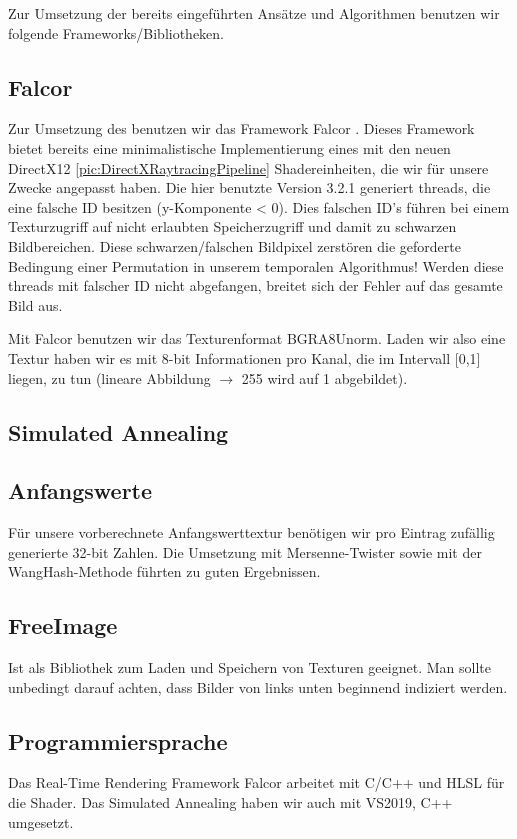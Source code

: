 Zur Umsetzung der bereits eingeführten Ansätze und Algorithmen benutzen wir folgende Frameworks/Bibliotheken. 

\subsection{Falcor}

Zur Umsetzung des  benutzen wir das Framework Falcor \cite{Benty18}. Dieses Framework bietet bereits eine minimalistische Implementierung 
eines  mit den neuen DirectX12 \ref{pic:DirectXRaytracingPipeline} Shadereinheiten, die wir für unsere Zwecke angepasst haben. 
Die hier benutzte Version 3.2.1 generiert threads, die eine falsche ID besitzen (y-Komponente < 0). Dies falschen ID's führen bei einem Texturzugriff auf nicht erlaubten
Speicherzugriff und damit zu schwarzen Bildbereichen. Diese schwarzen/falschen Bildpixel zerstören die geforderte Bedingung einer Permutation in unserem temporalen Algorithmus! 
Werden diese threads mit falscher ID nicht abgefangen, breitet sich der Fehler auf das gesamte Bild aus.\par
Mit Falcor benutzen wir das Texturenformat BGRA8Unorm. Laden wir also eine Textur haben wir es mit 8-bit Informationen pro Kanal, die im Intervall [0,1] liegen, zu tun (lineare
Abbildung $\rightarrow$ 255 wird auf 1 abgebildet).

\subsection{Simulated Annealing}

\subsection{Anfangswerte}
Für unsere vorberechnete Anfangswerttextur benötigen wir pro Eintrag zufällig generierte 32-bit Zahlen. Die Umsetzung mit Mersenne-Twister \cite{MersenneTwister} sowie mit 
der WangHash-Methode \cite{wanghash} führten zu guten Ergebnissen.

\subsection{FreeImage}
Ist als Bibliothek \cite{FreeImage} zum Laden und Speichern von Texturen geeignet. Man sollte unbedingt darauf achten, dass Bilder von links unten beginnend 
indiziert werden.

\subsection{Programmiersprache}
Das Real-Time Rendering Framework Falcor arbeitet mit C/C++ und HLSL für die Shader. Das Simulated Annealing haben wir auch mit VS2019, C++ umgesetzt.

